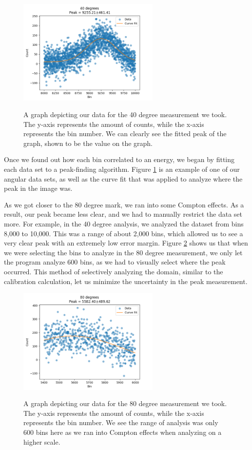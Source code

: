 \documentclass[10pt,letterpaper,onecolumn]{article}
\begin{document}
\begin{figure}[hbt!]
    \begin{center}
        {{\includegraphics[width=7cm]{40.png} }}%
        \caption{A graph depicting our data for the 40 degree measurement we took. The y-axis represents the amount of counts, while the x-axis represents the bin number. We can clearly see the fitted peak of the graph, shown to be the value on the graph.}%
        \label{fig:40}%
    \end{center}
\end{figure}

Once we found out how each bin correlated to an energy, we began by fitting each data set to a peak-finding algorithm. Figure \ref{fig:40} is an example of one of our angular data sets, as well as the curve fit that was applied to analyze where the peak in the image was. 

As we got closer to the 80 degree mark, we ran into some Compton effects. As a result, our peak became less clear, and we had to manually restrict the data set more. For example, in the 40 degree analysis, we analyzed the dataset from bins 8,000 to 10,000. This was a range of about 2,000 bins, which allowed us to see a very clear peak with an extremely low error margin. Figure \ref{fig:80} shows us that when we were selecting the bins to analyze in the 80 degree measurement, we only let the program analyze 600 bins, as we had to visually select where the peak occurred. This method of selectively analyzing the domain, similar to the calibration calculation, let us minimize the uncertainty in the peak measurement. 

\begin{figure}[hbt!]
    \begin{center}
        {{\includegraphics[width=7cm]{80.png} }}%
        \caption{A graph depicting our data for the 80 degree measurement we took. The y-axis represents the amount of counts, while the x-axis represents the bin number. We see the range of analysis was only 600 bins here as we ran into Compton effects when analyzing on a higher scale.}%
        \label{fig:80}%
    \end{center}
\end{figure}
\end{document}
